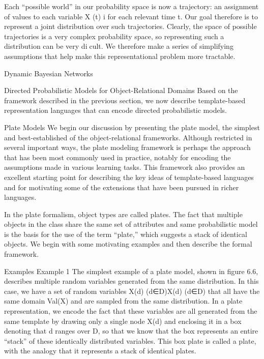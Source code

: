 Each “possible world” in our probability space is now a trajectory: an assignment of values to each variable X (t) i for each relevant time t. Our goal therefore is to represent a joint distribution over such trajectories. Clearly, the space of possible trajectories is a very complex probability space, so representing such a distribution can be very dicult. We therefore make a series of simplifying assumptions that help make this representational problem more tractable.

Dynamic Bayesian Networks




Directed Probabilistic Models for Object-Relational Domains
Based on the framework described in the previous section, we now describe template-based representation languages that can encode directed probabilistic models.

Plate Models
We begin our discussion by presenting the plate model, the simplest and best-established of the object-relational frameworks. Although restricted in several important ways, the plate modeling framework is perhaps the approach that has been most commonly used in practice, notably for encoding the assumptions made in various learning tasks. This framework also provides an excellent starting point for describing the key ideas of template-based languages and for motivating some of the extensions that have been pursued in richer languages.

In the plate formalism, object types are called plates. The fact that multiple objects in the class share the same set of attributes and same probabilistic model is the basis for the use of the term “plate,” which suggests a stack of identical objects. We begin with some motivating examples and then describe the formal framework.

Examples
Example 1 The simplest example of a plate model, shown in figure 6.6, describes multiple random variables generated from the same distribution. In this case, we have a set of random variables X(d) (d∈D)X(d) (d∈D) that all have the same domain Val(X) and are sampled from the same distribution. In a plate representation, we encode the fact that these variables are all generated from the same template by drawing only a single node X(d) and enclosing it in a box denoting that d ranges over D, so that we know that the box represents an entire “stack” of these identically distributed variables. This box plate is called a plate, with the analogy that it represents a stack of identical plates.

